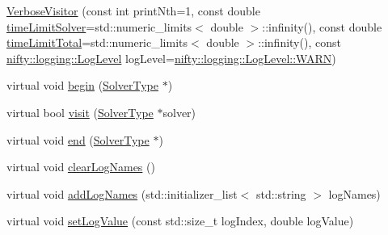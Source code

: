 \begin{DoxyCompactItemize}
\item 
\hyperlink{classnifty_1_1graph_1_1optimization_1_1common_1_1VerboseVisitor_a028c3f88308487c69c4a2bf03b888a46}{Verbose\+Visitor} (const int print\+Nth=1, const double \hyperlink{classnifty_1_1graph_1_1optimization_1_1common_1_1VerboseVisitor_ad866c89e0f89adaec4dece682de2bd85}{time\+Limit\+Solver}=std\+::numeric\+\_\+limits$<$ double $>$\+::infinity(), const double \hyperlink{classnifty_1_1graph_1_1optimization_1_1common_1_1VerboseVisitor_a7f781c5188962960470d5af7919b4b0e}{time\+Limit\+Total}=std\+::numeric\+\_\+limits$<$ double $>$\+::infinity(), const \hyperlink{namespacenifty_1_1logging_a3385625f9a0dbb17f70c47d3fca2f64d}{nifty\+::logging\+::\+Log\+Level} log\+Level=\hyperlink{namespacenifty_1_1logging_a3385625f9a0dbb17f70c47d3fca2f64da32bd8a1db2275458673903bdb84cb277}{nifty\+::logging\+::\+Log\+Level\+::\+W\+A\+R\+N})
\item 
virtual void \hyperlink{classnifty_1_1graph_1_1optimization_1_1common_1_1VerboseVisitor_a388b19be122ab3a16279acd40c6d221f}{begin} (\hyperlink{classnifty_1_1graph_1_1optimization_1_1common_1_1VisitorBase_a233e657d5334c972e39a44ac675f6e85}{Solver\+Type} $\ast$)
\item 
virtual bool \hyperlink{classnifty_1_1graph_1_1optimization_1_1common_1_1VerboseVisitor_ac5be3b84a6b1f689c638bb30616fc516}{visit} (\hyperlink{classnifty_1_1graph_1_1optimization_1_1common_1_1VisitorBase_a233e657d5334c972e39a44ac675f6e85}{Solver\+Type} $\ast$solver)
\item 
virtual void \hyperlink{classnifty_1_1graph_1_1optimization_1_1common_1_1VerboseVisitor_ae1478e83980c915326ec605273fbb2d1}{end} (\hyperlink{classnifty_1_1graph_1_1optimization_1_1common_1_1VisitorBase_a233e657d5334c972e39a44ac675f6e85}{Solver\+Type} $\ast$)
\item 
virtual void \hyperlink{classnifty_1_1graph_1_1optimization_1_1common_1_1VerboseVisitor_aba50a70681868f56b5939fa9fd86c264}{clear\+Log\+Names} ()
\item 
virtual void \hyperlink{classnifty_1_1graph_1_1optimization_1_1common_1_1VerboseVisitor_a3044bf767bf95e72ac2d1b4bf80d1071}{add\+Log\+Names} (std\+::initializer\+\_\+list$<$ std\+::string $>$ log\+Names)
\item 
virtual void \hyperlink{classnifty_1_1graph_1_1optimization_1_1common_1_1VerboseVisitor_aa8ae685cd1451988fa5afb95402d0087}{set\+Log\+Value} (const std\+::size\+\_\+t log\+Index, double log\+Value)
\item 

\end{DoxyCompactItemize}
